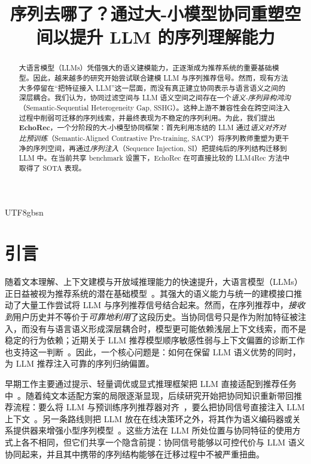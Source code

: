 \documentclass{article}
\title{序列去哪了？通过大-小模型协同重塑空间以提升 LLM 的序列理解能力}
\author{}
\date{}
\begin{document}
\ifPDFTeX
\begin{CJK*}{UTF8}{gbsn}
\fi

\maketitle

\begin{abstract}
大语言模型（LLMs）凭借强大的语义建模能力，正逐渐成为推荐系统的重要基础模型。因此，越来越多的研究开始尝试联合建模 LLM 与序列推荐信号。然而，现有方法大多停留在“把特征接入 LLM”这一层面，而没有真正建立协同表示与语言语义之间的深层耦合。我们认为，协同过滤空间与 LLM 语义空间之间存在一个\emph{语义-序列异构鸿沟}（Semantic-Sequential Heterogeneity Gap, SSHG）。这种上游不兼容性会在跨空间注入过程中削弱可迁移的序列线索，并最终表现为不稳定的序列利用。为此，我们提出 \textbf{EchoRec}，一个分阶段的大-小模型协同框架：首先利用冻结的 LLM 通过\emph{语义对齐对比预训练}（Semantic-Aligned Contrastive Pre-training, SACP）将序列教师重塑为更干净的序列空间，再通过\emph{序列注入}（Sequence Injection, SI）把提纯后的序列结构迁移到 LLM 中。在当前共享 benchmark 设置下，EchoRec 在可直接比较的 LLM4Rec 方法中取得了 SOTA 表现。
\end{abstract}

\section{引言}
\label{sec:introduction}

随着文本理解、上下文建模与开放域推理能力的快速提升，大语言模型（LLMs）正日益被视为推荐系统的潜在基础模型~\cite{lin2025survey,zhao2024era}。其强大的语义能力与统一的建模接口推动了大量工作尝试将 LLM 与序列推荐信号结合起来。然而，在序列推荐中，\emph{接收到}用户历史并不等价于\emph{可靠地利用}了这段历史。当协同信号只是作为附加特征被注入，而没有与语言语义形成深层耦合时，模型更可能依赖浅层上下文线索，而不是稳定的行为依赖；近期关于 LLM 推荐模型顺序敏感性弱与上下文偏置的诊断工作也支持这一判断~\cite{kim2025lost,wang2026contextbias}。因此，一个核心问题是：如何在保留 LLM 语义优势的同时，为 LLM 推荐注入可靠的序列归纳偏置。

早期工作主要通过提示、轻量调优或显式推理框架把 LLM 直接适配到推荐任务中~\cite{bao2023tallrec,yu2026thinkrec}。随着纯文本适配方案的局限逐渐显现，后续研究开始把协同知识重新带回推荐流程：要么将 LLM 与预训练序列推荐器对齐~\cite{liao2024llara,kim2024allmrec}，要么把协同信号直接注入 LLM 上下文~\cite{zhang2025collm,zheng2024lcrec,hong2025eagerllm,kim2025lost}。另一条路线则把 LLM 放在在线决策环之外，将其作为语义编码器或关系提供器来增强小型序列模型~\cite{ren2024rlmrec,yang2024lrd,liu2024llmesr,cui2025sracl}。这些方法在 LLM 所处位置与协同特征的使用方式上各不相同，但它们共享一个隐含前提：协同信号能够以可控代价与 LLM 语义协同起来，并且其中携带的序列结构能够在迁移过程中不被严重扭曲。


\end{CJK*}
\end{document}

